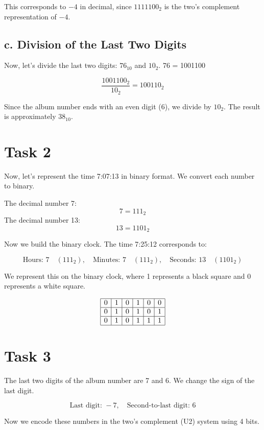 \documentclass{article}
\begin{document}
This corresponds to \( -4 \) in decimal, since \( 1111100_2 \) is the two's complement representation of \( -4 \).

\subsection*{c. Division of the Last Two Digits}

Now, let's divide the last two digits: \(76_{10}\) and \(10_2\).
76 = 1001100

\[
\frac{1001100_2}{10_2} = 100110_2
\]

Since the album number ends with an even digit (6), we divide by \(10_{2}\). The result is approximately \(38_{10}\).

\section*{Task 2}

Now, let's represent the time 7:07:13 in binary format. We convert each number to binary.

The decimal number 7:
\[
7 = 111_2
\]
The decimal number 13:
\[
13 = 1101_2
\]

Now we build the binary clock. The time 7:25:12 corresponds to:

\[
\text{Hours: } 7 \quad (111_2), \quad \text{Minutes: } 7 \quad (111_2), \quad \text{Seconds: } 13 \quad (1101_2)
\]

We represent this on the binary clock, where 1 represents a black square and 0 represents a white square.

\[
\begin{array}{|c|c|c|c|c|c|}
\hline
0 & 1 & 0 & 1 & 0 & 0 \\
\hline
0 & 1 & 0 & 1 & 0 & 1 \\
\hline
0 & 1 & 0 & 1 & 1 & 1 \\
\hline
\end{array}
\]

\section*{Task 3}

The last two digits of the album number are 7 and 6. We change the sign of the last digit.

\[
\text{Last digit: } -7, \quad \text{Second-to-last digit: } 6
\]

Now we encode these numbers in the two's complement (U2) system using 4 bits.
\end{document}
